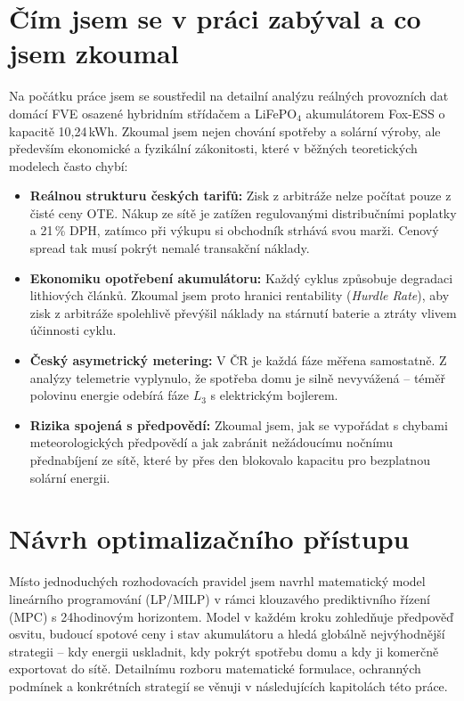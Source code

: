 \documentclass[FM,BP]{tulthesis}
\begin{document}
	\section*{Čím jsem se v práci zabýval a co jsem zkoumal}
	Na počátku práce jsem se soustředil na detailní analýzu reálných provozních dat domácí FVE osazené hybridním střídačem a LiFePO$_4$ akumulátorem Fox-ESS o kapacitě 10,24\,kWh. Zkoumal jsem nejen chování spotřeby a solární výroby, ale především ekonomické a fyzikální zákonitosti, které v běžných teoretických modelech často chybí:
	\begin{itemize}
		\item \textbf{Reálnou strukturu českých tarifů:} Zisk z arbitráže nelze počítat pouze z čisté ceny OTE. Nákup ze sítě je zatížen regulovanými distribučními poplatky a 21\,\% DPH, zatímco při výkupu si obchodník strhává svou marži. Cenový spread tak musí pokrýt nemalé transakční náklady.
		\item \textbf{Ekonomiku opotřebení akumulátoru:} Každý cyklus způsobuje degradaci lithiových článků. Zkoumal jsem proto hranici rentability (\textit{Hurdle Rate}), aby zisk z arbitráže spolehlivě převýšil náklady na stárnutí baterie a ztráty vlivem účinnosti cyklu.
		\item \textbf{Český asymetrický metering:} V ČR je každá fáze měřena samostatně. Z analýzy telemetrie vyplynulo, že spotřeba domu je silně nevyvážená -- téměř polovinu energie odebírá fáze $L_3$ s elektrickým bojlerem.
		\item \textbf{Rizika spojená s předpovědí:} Zkoumal jsem, jak se vypořádat s chybami meteorologických předpovědí a jak zabránit nežádoucímu nočnímu přednabíjení ze sítě, které by přes den blokovalo kapacitu pro bezplatnou solární energii.
	\end{itemize}

	\section*{Návrh optimalizačního přístupu}
	Místo jednoduchých rozhodovacích pravidel jsem navrhl matematický model lineárního programování (LP/MILP) v rámci klouzavého prediktivního řízení (MPC) s 24hodinovým horizontem. Model v každém kroku zohledňuje předpověď osvitu, budoucí spotové ceny i stav akumulátoru a hledá globálně nejvýhodnější strategii -- kdy energii uskladnit, kdy pokrýt spotřebu domu a kdy ji komerčně exportovat do sítě. Detailnímu rozboru matematické formulace, ochranných podmínek a konkrétních strategií se věnuji v následujících kapitolách této práce.
\end{document}
